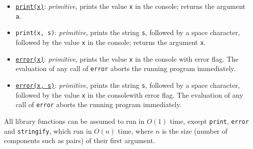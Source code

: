 \begin{itemize}
    non-string value.
  \item
    \href{https://sourceacademy.org/sicpjs/1.2.6\#footnote-7}{\texttt{print(x)}}:
    \textit{primitive}, prints the value \texttt{x} in the
    console; returns the argument \texttt{a}.
  \item \texttt{print(x, s)}: \textit{primitive}, prints the
    string \texttt{s}, followed by a space character, followed by the
    value \texttt{x} in the console; returns the argument \texttt{x}.
  \item
    \href{https://sourceacademy.org/sicpjs/1.2.6\#footnote-7}{\texttt{error(x)}}:
    \textit{primitive}, prints the value \texttt{x} in the
    console with error flag. The evaluation of any call of
    \texttt{error} aborts the running program immediately.
  \item
    \href{https://sourceacademy.org/sicpjs/2.1.3\#footnote-2}{\texttt{error(x,
    s)}}: \textit{primitive}, prints the string \texttt{s},
    followed by a space character, followed by the value \texttt{x}
    in the console\footnotemark[\value{footnote}] with error flag.
    The evaluation
    of any call of \texttt{error} aborts the running program immediately.
\end{itemize}
All library functions can be assumed to run
in $O(1)$ time, except \texttt{print}, \texttt{error} and \texttt{stringify},
which run in $O(n)$ time, where $n$ is
the size (number of components such as pairs) of their first argument.
